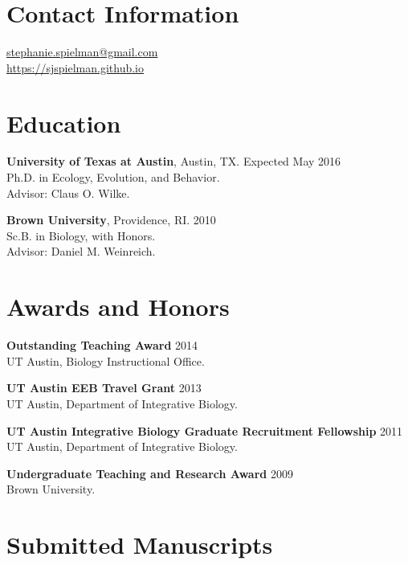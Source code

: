 \documentclass[line, margin]{res}
\begin{document}


\begin{resume}
\vspace{0.5cm}
\section{Contact Information}
	\href{mailto:stephanie.spielman@gmail.com}{stephanie.spielman@gmail.com} \\
	\url{https://sjspielman.github.io}
	
\vspace{0.75cm}
	
\section{Education}

\textbf{University of Texas at Austin}, Austin, TX. \hfill Expected May 2016 \\ Ph.D. in Ecology, Evolution, and Behavior. \\ Advisor: Claus O. Wilke.


\textbf{Brown University}, Providence, RI.  \hfill 2010 \\ Sc.B. in Biology, with Honors. \\ Advisor: Daniel M. Weinreich.

\vspace{0.75cm}

\section{Awards and Honors}

\textbf{Outstanding Teaching Award} \hfill 2014 \\ UT Austin, Biology Instructional Office.

\textbf{UT Austin EEB Travel Grant} \hfill 2013 \\ UT Austin, Department of Integrative Biology.

\textbf{UT Austin Integrative Biology Graduate Recruitment Fellowship} \hfill 2011 \\ UT Austin, Department of Integrative Biology.

\textbf{Undergraduate Teaching and Research Award} \hfill 2009 \\ Brown University.

\vspace{0.75cm}
		

\section{Submitted Manuscripts}


\end{resume}
\end{document}
